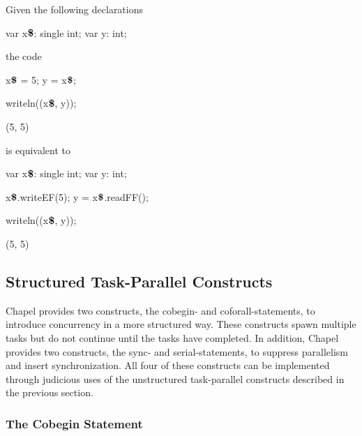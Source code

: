 \begin{example}
Given the following declarations
\begin{chapelpre}
\end{chapelpre}
\begin{chapel}
var x$\mbox{{\bf \$}}$: single int;
var y: int;
\end{chapel}
the code
\begin{chapel}
x$\mbox{{\bf \$}}$ = 5;
y = x$\mbox{{\bf \$}}$;
\end{chapel}
\begin{chapelpost}
writeln((x$\mbox{{\bf \$}}$, y));
\end{chapelpost}
\begin{chapeloutput}
(5, 5)
\end{chapeloutput}
is equivalent to
\begin{chapelpre}
var x$\mbox{{\bf \$}}$: single int;
var y: int;
\end{chapelpre}
\begin{chapel}
x$\mbox{{\bf \$}}$.writeEF(5);
y = x$\mbox{{\bf \$}}$.readFF();
\end{chapel}
\begin{chapelpost}
writeln((x$\mbox{{\bf \$}}$, y));
\end{chapelpost}
\begin{chapeloutput}
(5, 5)
\end{chapeloutput}
\end{example}

\subsection{Structured Task-Parallel Constructs}
\label{structured_task_parallelism}

Chapel provides two constructs, the cobegin- and coforall-statements,
to introduce concurrency in a more structured way.  These constructs
spawn multiple tasks but do not continue until the tasks have
completed.  In addition, Chapel provides two constructs, the sync- and
serial-statements, to suppress parallelism and insert synchronization.
All four of these constructs can be implemented through judicious uses
of the unstructured task-parallel constructs described in the previous
section.

\subsubsection{The Cobegin Statement}
\label{Cobegin}

